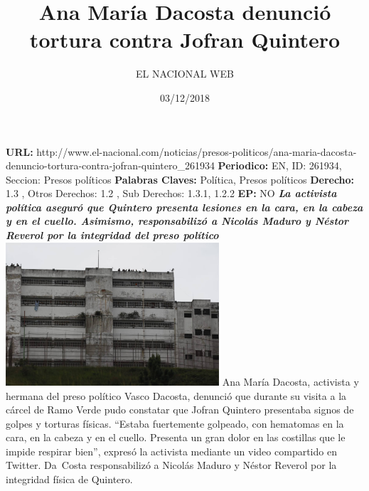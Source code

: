 \documentclass{article}%
\title{\textbf{Ana María Dacosta denunció tortura contra Jofran Quintero}}%
\author{EL NACIONAL WEB}%
\date{03/12/2018}%
\begin{document}
%
\normalsize%
\maketitle%
\textbf{URL: }%
http://www.el{-}nacional.com/noticias/presos{-}politicos/ana{-}maria{-}dacosta{-}denuncio{-}tortura{-}contra{-}jofran{-}quintero\_261934\newline%
%
\textbf{Periodico: }%
EN, %
ID: %
261934, %
Seccion: %
Presos políticos\newline%
%
\textbf{Palabras Claves: }%
Política, Presos políticos\newline%
%
\textbf{Derecho: }%
1.3%
, Otros Derechos: %
1.2%
, Sub Derechos: %
1.3.1, 1.2.2%
\newline%
%
\textbf{EP: }%
NO\newline%
\newline%
%
\textbf{\textit{La activista política aseguró que Quintero presenta lesiones en la cara, en la cabeza y en el cuello. Asimismo, responsabilizó a Nicolás Maduro y Néstor Reverol por la integridad del preso político}}%
\newline%
\newline%
%
\includegraphics[width=300px]{14.jpg}%
\newline%
%
Ana María Dacosta, activista y hermana del preso político Vasco Dacosta, denunció que durante su visita a la cárcel de Ramo Verde pudo constatar que Jofran Quintero presentaba signos de golpes y torturas físicas.%
\newline%
%
“Estaba fuertemente golpeado, con hematomas en la cara, en la cabeza y en el cuello. Presenta un gran dolor en las costillas que le impide respirar bien”, expresó la activista mediante un video compartido en Twitter.%
\newline%
%
Da~Costa responsabilizó a Nicolás Maduro y Néstor Reverol por la integridad física de Quintero.%
\newline%
%
\end{document}
